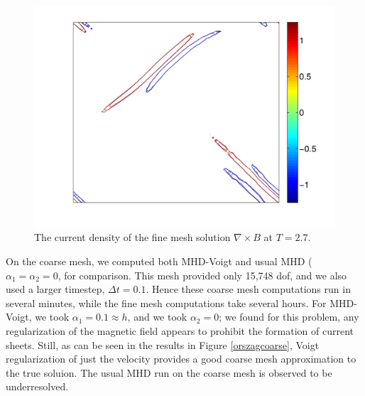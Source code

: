 \documentclass[11pt]{article}%
\numberwithin{equation}{section}
\begin{document}
\begin{figure}[htb]
\begin{center}
\includegraphics[width=.5\textwidth,height=0.5\textwidth, viewport=70 20 530 400, clip]{MHD_TO_DNS_fine.pdf}
\caption{\label{orszag} The current density of the fine mesh solution $\nabla \times B$ at $T=2.7$.}
\end{center}
\end{figure}

On the coarse mesh, we computed both MHD-Voigt and usual MHD ($\alpha_1=\alpha_2=0$, for comparison.  This mesh provided only 15,748 dof, and we also used a larger timestep, $\Delta t=0.1$.  Hence these coarse mesh computations run in several minutes, while the fine mesh computations take several hours.  For MHD-Voigt, we took $\alpha_1=0.1 \approx h$, and we took $\alpha_2=0$; we found for this problem, any regularization of the magnetic field appears to prohibit the formation of current sheets.  Still, as can be seen in the results in Figure \ref{orszagcoarse}, Voigt regularization of just the velocity provides a good coarse mesh approximation to the true soluion.  The usual MHD run on the coarse mesh is observed to be underresolved.
\end{document}

